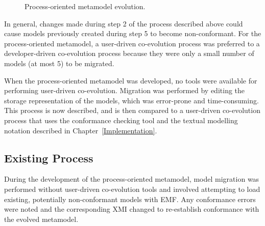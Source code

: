 \begin{figure}[htbp]
	\centering
	\caption{Process-oriented metamodel evolution.}
\label{fig:po_mms}
\end{figure}

In general, changes made during step 2 of the process described above could cause models previously created during step 5 to become non-conformant. For the process-oriented metamodel, a user-driven co-evolution process was preferred to a developer-driven co-evolution process because they were only a small number of models (at most 5) to be migrated.

When the process-oriented metamodel was developed, no tools were available for performing user-driven co-evolution. Migration was performed by editing the storage representation of the models, which was error-prone and time-consuming. This process is now described, and is then compared to a user-driven co-evolution process that uses the conformance checking tool and the textual modelling notation described in Chapter~\ref{Implementation}.

\subsection{Existing Process}
During the development of the process-oriented metamodel, model migration was performed without user-driven co-evolution tools and involved attempting to load existing, potentially non-conformant models with EMF. Any conformance errors were noted and the corresponding XMI changed to re-establish conformance with the evolved metamodel.

